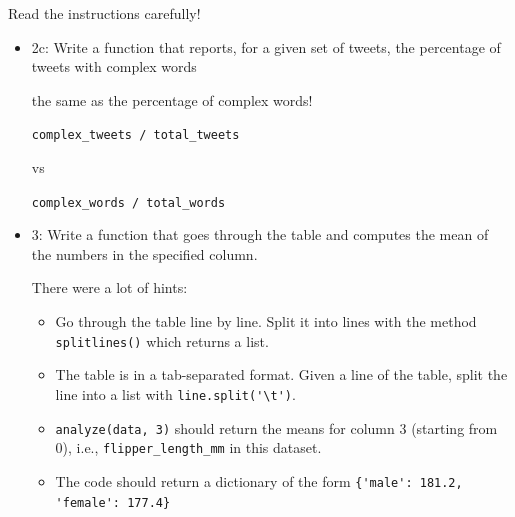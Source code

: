 \documentclass[aspectratio=169,usenames,dvipsnames]{beamer}
\begin{document}
\begin{frame}[fragile]{Read the instructions carefully!}
    \begin{itemize}
        \item 2c: Write a function that reports, for a given set of tweets, the
                percentage of tweets with complex words


                \vspace{1em}
                 the same as the percentage of complex words!

                    \lstinline|complex_tweets / total_tweets|

                    vs

                    \lstinline|complex_words / total_words|

        \pause
        \item 3: Write a function that goes through the table and computes the
            mean of the numbers in the specified column. 
            
            There were a lot of hints:
            \begin{itemize}
            \item Go through the table line by line. Split it into lines with
                the method \lstinline|splitlines()| which returns a list.
            \item The table is in a tab-separated format. Given a line of the
                table, split the line into a list with
                \lstinline|line.split('\t')|.
            \item \lstinline|analyze(data, 3)| should return the means for
                column 3 (starting from 0), i.e., \lstinline|flipper_length_mm|
                in this dataset.
            \item The code should return a dictionary of the form
                \lstinline|{'male': 181.2, 'female': 177.4}|
            \end{itemize}
    \end{itemize}
\end{frame}
\end{document}
